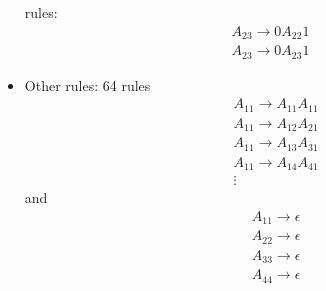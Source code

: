 \begin{frame}[allowframebreaks]
\begin{itemize}
rules:
\begin{equation*}
  \begin{split}
& A_{23} \rightarrow 0 A_{22} 1 \\
& A_{23} \rightarrow 0 A_{23} 1
\end{split}
\end{equation*}

\item Other rules: 64 rules
  \begin{eqnarray*}
&&A_{11}\rightarrow A_{11}A_{11}\\
&&A_{11}\rightarrow A_{12}A_{21}\\
&&A_{11}\rightarrow A_{13}A_{31}\\
&&A_{11}\rightarrow A_{14}A_{41}\\
&&\vdots
\end{eqnarray*}
and
\begin{eqnarray*}
&& A_{11}\rightarrow \epsilon \\  
&& A_{22}\rightarrow \epsilon \\
&& A_{33}\rightarrow \epsilon \\
&& A_{44}\rightarrow \epsilon 
\end{eqnarray*}

\end{itemize}\end{frame}


